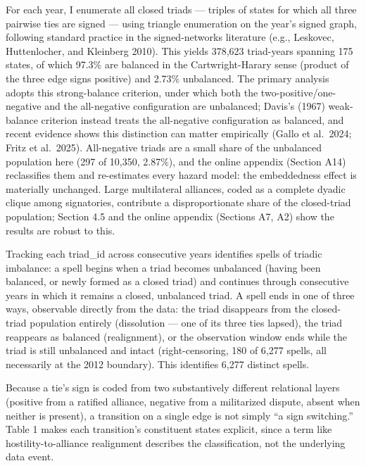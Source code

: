 \documentclass[Afour,sageh,times,doublespace]{sagej}
\begin{document}
For each year, I enumerate all closed triads --- triples of states for which all three pairwise ties are signed --- using triangle enumeration on the year's signed graph, following standard practice in the signed-networks literature (e.g., Leskovec, Huttenlocher, and Kleinberg 2010). This yields 378,623 triad-years spanning 175 states, of which 97.3\% are balanced in the Cartwright-Harary sense (product of the three edge signs positive) and 2.73\% unbalanced. The primary analysis adopts this strong-balance criterion, under which both the two-positive/one-negative and the all-negative configuration are unbalanced; Davis's (1967) weak-balance criterion instead treats the all-negative configuration as balanced, and recent evidence shows this distinction can matter empirically (Gallo et al.~2024; Fritz et al.~2025). All-negative triads are a small share of the unbalanced population here (297 of 10,350, 2.87\%), and the online appendix (Section A14) reclassifies them and re-estimates every hazard model: the embeddedness effect is materially unchanged. Large multilateral alliances, coded as a complete dyadic clique among signatories, contribute a disproportionate share of the closed-triad population; Section 4.5 and the online appendix (Sections A7, A2) show the results are robust to this.

Tracking each triad\_id across consecutive years identifies spells of triadic imbalance: a spell begins when a triad becomes unbalanced (having been balanced, or newly formed as a closed triad) and continues through consecutive years in which it remains a closed, unbalanced triad. A spell ends in one of three ways, observable directly from the data: the triad disappears from the closed-triad population entirely (dissolution --- one of its three ties lapsed), the triad reappears as balanced (realignment), or the observation window ends while the triad is still unbalanced and intact (right-censoring, 180 of 6,277 spells, all necessarily at the 2012 boundary). This identifies 6,277 distinct spells.

Because a tie's sign is coded from two substantively different relational layers (positive from a ratified alliance, negative from a militarized dispute, absent when neither is present), a transition on a single edge is not simply ``a sign switching.'' Table 1 makes each transition's constituent states explicit, since a term like hostility-to-alliance realignment describes the classification, not the underlying data event.
\end{document}
